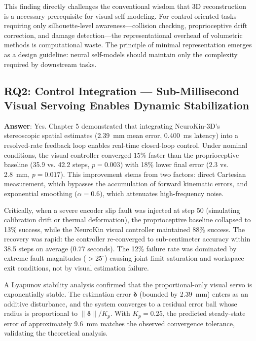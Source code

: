 \documentclass[12pt,a4paper,oneside]{report}
\begin{document}
This finding directly challenges the conventional wisdom that 3D reconstruction is a necessary prerequisite for visual self-modeling. For control-oriented tasks requiring only silhouette-level awareness---collision checking, proprioceptive drift correction, and damage detection---the representational overhead of volumetric methods is computational waste. The principle of minimal representation emerges as a design guideline: neural self-models should maintain only the complexity required by downstream tasks.

\subsection{RQ2: Control Integration --- Sub-Millisecond Visual Servoing Enables Dynamic Stabilization}
\textbf{Answer}: Yes. Chapter 5 demonstrated that integrating NeuroKin-3D's stereoscopic spatial estimates (2.39~mm mean error, 0.400~ms latency) into a resolved-rate feedback loop enables real-time closed-loop control. Under nominal conditions, the visual controller converged 15\% faster than the proprioceptive baseline (35.9 vs. 42.2 steps, $p = 0.003$) with 18\% lower final error (2.3 vs. 2.8~mm, $p = 0.017$). This improvement stems from two factors: direct Cartesian measurement, which bypasses the accumulation of forward kinematic errors, and exponential smoothing ($\alpha = 0.6$), which attenuates high-frequency noise.

Critically, when a severe encoder slip fault was injected at step 50 (simulating calibration drift or thermal deformation), the proprioceptive baseline collapsed to 13\% success, while the NeuroKin visual controller maintained 88\% success. The recovery was rapid: the controller re-converged to sub-centimeter accuracy within 38.5 steps on average (0.77 seconds). The 12\% failure rate was dominated by extreme fault magnitudes ($>25^\circ$) causing joint limit saturation and workspace exit conditions, not by visual estimation failure.

A Lyapunov stability analysis confirmed that the proportional-only visual servo is exponentially stable. The estimation error $\boldsymbol{\delta}$ (bounded by 2.39~mm) enters as an additive disturbance, and the system converges to a residual error ball whose radius is proportional to $\|\boldsymbol{\delta}\|/K_p$. With $K_p = 0.25$, the predicted steady-state error of approximately 9.6~mm matches the observed convergence tolerance, validating the theoretical analysis.
\end{document}
